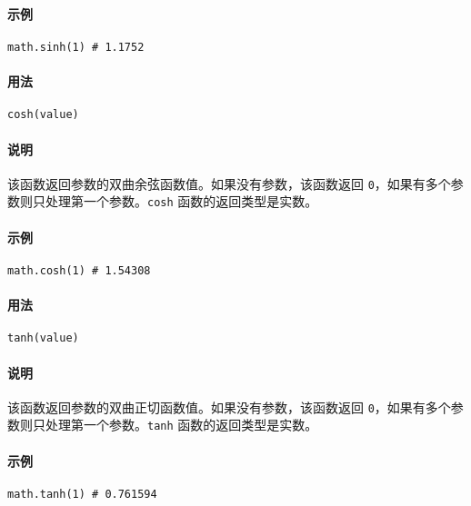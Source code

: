 \paragraph{示例}
\begin{lstlisting}[language=berry, numbers=none]
math.sinh(1) # 1.1752
\end{lstlisting}


\paragraph{用法}
\begin{lstlisting}[language=berry, numbers=none]
cosh(value)
\end{lstlisting}

\paragraph{说明}
该函数返回参数的双曲余弦函数值。如果没有参数，该函数返回 \texttt{0}，如果有多个参数则只处理第一个参数。\texttt{cosh} 函数的返回类型是实数。

\paragraph{示例}
\begin{lstlisting}[language=berry, numbers=none]
math.cosh(1) # 1.54308
\end{lstlisting}


\paragraph{用法}
\begin{lstlisting}[language=berry, numbers=none]
tanh(value)
\end{lstlisting}

\paragraph{说明}
该函数返回参数的双曲正切函数值。如果没有参数，该函数返回 \texttt{0}，如果有多个参数则只处理第一个参数。\texttt{tanh} 函数的返回类型是实数。

\paragraph{示例}
\begin{lstlisting}[language=berry, numbers=none]
math.tanh(1) # 0.761594
\end{lstlisting}

